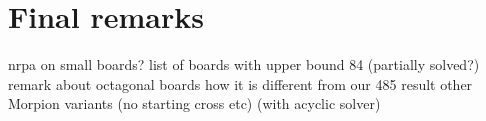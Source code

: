 

\section{Final remarks}
  nrpa on small boards?
  list of boards with upper bound 84 (partially solved?)
  remark about octagonal boards
  how it is different from our 485 result
  other Morpion variants (no starting cross etc)
    (with acyclic solver)
